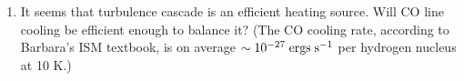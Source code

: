 \documentclass[12pt, letterpaper]{article}
\begin{document}
\begin{enumerate}
\item It seems that turbulence cascade is an efficient heating source. Will CO line cooling be efficient enough to balance it? (The CO cooling rate, according to Barbara's ISM textbook, is on average $\sim 10^{-27}\rm\;ergs\;s^{-1}$ per hydrogen nucleus at 10 K.)
 

\end{enumerate}


\end{document}
